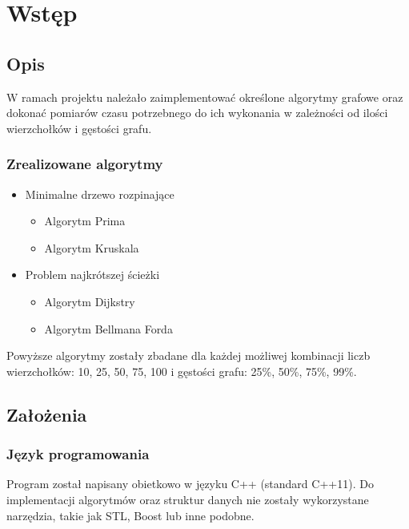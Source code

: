 \documentclass[12pt]{article}
\begin{document}

\setcounter{tocdepth}{2}
\localtableofcontents
\newpage
\setlength{\tabcolsep}{15pt}


\section{Wstęp}
\subsection{Opis}

W ramach projektu należało zaimplementować określone algorytmy grafowe oraz dokonać pomiarów czasu potrzebnego do ich wykonania w zależności od ilości wierzchołków i gęstości grafu.

\subsubsection{Zrealizowane algorytmy}
\begin{itemize}
\item Minimalne drzewo rozpinające
\begin{itemize}
    \item Algorytm Prima
    \item Algorytm Kruskala
    \end{itemize}
    \item Problem najkrótszej ścieżki
    \begin{itemize}
    \item Algorytm Dijkstry
    \item Algorytm Bellmana Forda
\end{itemize}
\end{itemize}

Powyższe algorytmy zostały zbadane dla każdej możliwej kombinacji liczb wierzchołków: 10, 25, 50, 75, 100 i gęstości grafu: 25\%, 50\%, 75\%, 99\%.

\newpage
\subsection{Założenia}

\subsubsection{Język programowania}
Program został napisany obietkowo w języku C++ (standard C++11). Do implementacji algorytmów oraz struktur danych nie zostały wykorzystane narzędzia, takie jak STL, Boost lub inne podobne.
\end{document}
